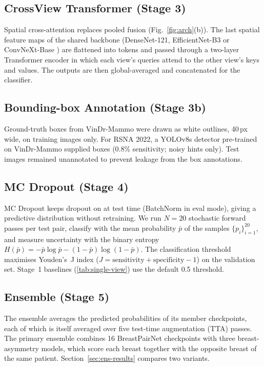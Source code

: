 \documentclass[conference]{IEEEtran}
\newcommand{\vindr}{VinDr-Mammo}
\newcommand{\rsna}{RSNA 2022}
\begin{document}
\subsection{CrossView Transformer (Stage 3)}

Spatial cross-attention replaces pooled fusion (Fig.~\ref{fig:arch}(b)). The last spatial feature maps of the shared backbone (DenseNet-121, EfficientNet-B3 or ConvNeXt-Base \cite{16}) are flattened into tokens and passed through a two-layer Transformer encoder in which each view's queries attend to the other view's keys and values. The outputs are then global-averaged and concatenated for the classifier.

\subsection{Bounding-box Annotation (Stage 3b)}

Ground-truth boxes from \vindr{} were drawn as white outlines, 40\,px wide, on training images only. For \rsna{}, a YOLOv8s detector pre-trained on \vindr{} supplied boxes (0.8\% sensitivity; noisy hints only). Test images remained unannotated to prevent leakage from the box annotations.

\subsection{MC Dropout (Stage 4)}

MC Dropout \cite{13} keeps dropout on at test time (BatchNorm in eval mode), giving a predictive distribution without retraining. We run $N=20$ stochastic forward passes per test pair, classify with the mean probability $\bar{p}$ of the samples $\{p_i\}_{i=1}^{20}$, and measure uncertainty with the binary entropy $H(\bar{p})=-\bar{p}\log\bar{p}-(1-\bar{p})\log(1-\bar{p})$. The classification threshold maximises Youden's~J index \cite{19} ($J = \text{sensitivity} + \text{specificity} - 1$) on the validation set. Stage~1 baselines (\autoref{tab:single-view}) use the default 0.5 threshold.

\subsection{Ensemble (Stage 5)}\label{sec:ens-method}

The ensemble averages the predicted probabilities of its member checkpoints, each of which is itself averaged over five test-time augmentation (TTA) passes. The primary ensemble combines 16 BreastPairNet checkpoints with three breast-asymmetry models, which score each breast together with the opposite breast of the same patient. Section~\ref{sec:ens-results} compares two variants.
\end{document}

